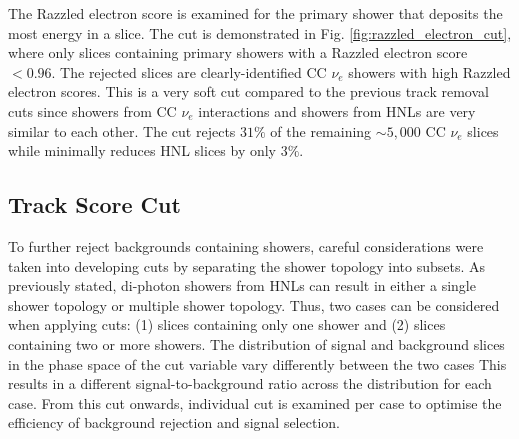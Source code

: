 The Razzled electron score is examined for the primary shower that deposits the most energy in a slice.
The cut is demonstrated in Fig. \ref{fig:razzled_electron_cut}, where only slices containing primary showers with a Razzled electron score $< 0.96$.
The rejected slices are clearly-identified CC $\nu_e$ showers with high Razzled electron scores.
This is a very soft cut compared to the previous track removal cuts since showers from CC $\nu_e$ interactions and showers from HNLs are very similar to each other.
The cut rejects $31\%$ of the remaining $\sim5,000$ CC $\nu_e$ slices while minimally reduces HNL slices by only $3 \%$.

\subsection{Track Score Cut}
\label{sec:trk_score}

To further reject backgrounds containing showers, careful considerations were taken into developing cuts by separating the shower topology into subsets.
As previously stated, di-photon showers from HNLs can result in either a single shower topology or multiple shower topology.
Thus, two cases can be considered when applying cuts: (1) slices containing only one shower and (2) slices containing two or more showers.
The distribution of signal and background slices in the phase space of the cut variable vary differently between the two cases
This results in a different signal-to-background ratio across the distribution for each case.
From this cut onwards, individual cut is examined per case to optimise the efficiency of background rejection and signal selection. 

